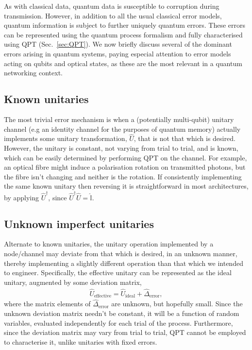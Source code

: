 \documentclass[aps,rmp,twocolumn,amsmath,amssymb,nofootinbib,superscriptaddress,longbibliography,floatfix,table-of-contents,eqsecnum]{revtex4-1}
\begin{document}
As with classical data, quantum data is susceptible to corruption during transmission. However, in addition to all the usual classical error models, quantum information is subject to further uniquely quantum errors. These errors can be represented using the quantum process formalism and fully characterised using QPT (Sec.~\ref{sec:QPT}). We now briefly discuss several of the dominant errors arising in quantum systems, paying especial attention to error models acting on qubits and optical states, as these are the most relevant in a quantum networking context.

%
%

\subsection{Known unitaries} 

The most trivial error mechanism is when a (potentially multi-qubit) unitary channel (e.g an identity channel for the purposes of quantum memory) actually implements some unitary transformation, $\hat{U}$, that is not that which is desired. However, the unitary is constant, not varying from trial to trial, and is known, which can be easily determined by performing QPT on the channel. For example, an optical fibre might induce a polarisation rotation on transmitted photons, but the fibre isn't changing and neither is the rotation. If consistently implementing the same known unitary then reversing it is straightforward in most architectures, by applying $\hat{U}^\dag$, since $\hat{U}^\dag\hat{U}=\hat{\mathbb{I}}$.

%
%

\subsection{Unknown imperfect unitaries} 

Alternate to known unitaries, the unitary operation implemented by a node/channel may deviate from that which is desired, in an unknown manner, thereby implementing a slightly different operation than that which we intended to engineer. Specifically, the effective unitary can be represented as the ideal unitary, augmented by some deviation matrix,
\begin{align}
	\hat{U}_\text{effective} = \hat{U}_\text{ideal} + \hat{\Delta}_\text{error},
\end{align}
where the matrix elements of $\hat{\Delta}_\text{error}$ are unknown, but hopefully small. Since the unknown deviation matrix needn't be constant, it will be a function of random variables, evaluated independently for each trial of the process. Furthermore, since the deviation matrix may vary from trial to trial, QPT cannot be employed to characterise it, unlike unitaries with fixed errors.
\end{document}
